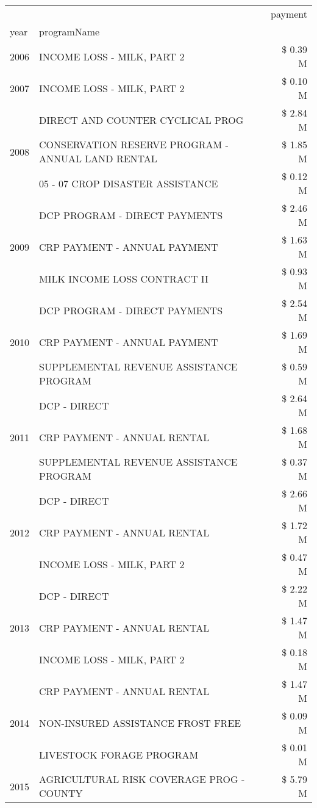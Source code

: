 \begin{tabular}{llr}
\toprule
 &  & payment \\
year & programName &  \\
\midrule
2006 & INCOME LOSS - MILK, PART 2 & \$ 0.39 M \\
\cline{1-3}
2007 & INCOME LOSS - MILK, PART 2 & \$ 0.10 M \\
\cline{1-3}
\multirow[t]{3}{*}{2008} & DIRECT AND COUNTER CYCLICAL PROG & \$ 2.84 M \\
 & CONSERVATION RESERVE PROGRAM - ANNUAL LAND RENTAL & \$ 1.85 M \\
 & 05 - 07 CROP DISASTER ASSISTANCE & \$ 0.12 M \\
\cline{1-3}
\multirow[t]{3}{*}{2009} & DCP PROGRAM - DIRECT PAYMENTS & \$ 2.46 M \\
 & CRP PAYMENT - ANNUAL PAYMENT & \$ 1.63 M \\
 & MILK INCOME LOSS CONTRACT II & \$ 0.93 M \\
\cline{1-3}
\multirow[t]{3}{*}{2010} & DCP PROGRAM - DIRECT PAYMENTS & \$ 2.54 M \\
 & CRP PAYMENT - ANNUAL PAYMENT & \$ 1.69 M \\
 & SUPPLEMENTAL REVENUE ASSISTANCE PROGRAM & \$ 0.59 M \\
\cline{1-3}
\multirow[t]{3}{*}{2011} & DCP - DIRECT & \$ 2.64 M \\
 & CRP PAYMENT - ANNUAL RENTAL & \$ 1.68 M \\
 & SUPPLEMENTAL REVENUE ASSISTANCE PROGRAM & \$ 0.37 M \\
\cline{1-3}
\multirow[t]{3}{*}{2012} & DCP - DIRECT & \$ 2.66 M \\
 & CRP PAYMENT - ANNUAL RENTAL & \$ 1.72 M \\
 & INCOME LOSS - MILK, PART 2 & \$ 0.47 M \\
\cline{1-3}
\multirow[t]{3}{*}{2013} & DCP - DIRECT & \$ 2.22 M \\
 & CRP PAYMENT - ANNUAL RENTAL & \$ 1.47 M \\
 & INCOME LOSS - MILK, PART 2 & \$ 0.18 M \\
\cline{1-3}
\multirow[t]{3}{*}{2014} & CRP PAYMENT - ANNUAL RENTAL & \$ 1.47 M \\
 & NON-INSURED ASSISTANCE FROST FREE & \$ 0.09 M \\
 & LIVESTOCK FORAGE PROGRAM & \$ 0.01 M \\
\cline{1-3}
\multirow[t]{3}{*}{2015} & AGRICULTURAL RISK COVERAGE PROG - COUNTY & \$ 5.79 M \\

\end{tabular}
